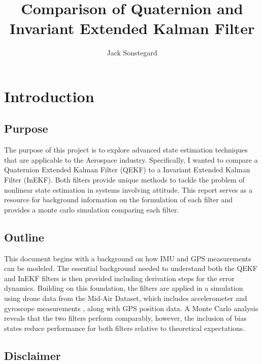 \title{Comparison of Quaternion and Invariant Extended Kalman Filter}
\author{Jack Sonstegard}

\maketitle

\section{Introduction}
\subsection{Purpose}

The purpose of this project is to explore advanced state estimation techniques that are applicable to the Aerospace industry. Specifically, I wanted to compare a Quaternion Extended Kalman Filter (QEKF) to a Invariant Extended Kalman Filter (InEKF). Both filters provide unique methods to tackle the problem of nonlinear state estimation in systems involving attitude. This report serves as a resource for background information on the formulation of each filter and provides a monte carlo simulation comparing each filter.

\subsection{Outline}

This document begins with a background on how IMU and GPS measurements can be modeled. The essential background needed to understand both the QEKF and InEKF filters is then provided including derivation steps for the error dynamics. Building on this foundation, the filters are applied in a simulation using drone data from the Mid-Air Dataset, which includes accelerometer and gyroscope measurements \cite{Fonder2019MidAir}, along with GPS position data. A Monte Carlo analysis reveals that the two filters perform comparably, however, the inclusion of bias states reduce performance for both filters relative to theoretical expectations.

\subsection{Disclaimer}

